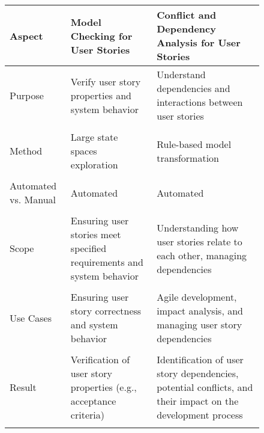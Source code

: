 \begin{figure}
\begingroup
\footnotesize
\centering
\begin{tabularx}{\textwidth}{l  X  X}
\hline
Aspect	&Model Checking for User Stories &	Conflict and Dependency Analysis for User Stories \\
\hline\hline
Purpose	&Verify user story properties and system behavior	&Understand dependencies and interactions between user stories \\\\ 
Method&	Large state spaces exploration&	Rule-based model transformation\\\\ 
Automated vs. Manual&	Automated	&Automated\\\\ 
Scope&	Ensuring user stories meet specified requirements and system behavior	&Understanding how user stories relate to each other, managing dependencies\\\\ 
Use Cases&	Ensuring user story correctness and system behavior	&Agile development, impact analysis, and managing user story dependencies\\\\ 
Result	&Verification of user story properties (e.g., acceptance criteria)	&Identification of user story dependencies, potential conflicts, and their impact on the development process\\\\ 
\hline
\end{tabularx}

\label{tb:sec_6_comparative_analysis}

\endgroup
\end{figure}

